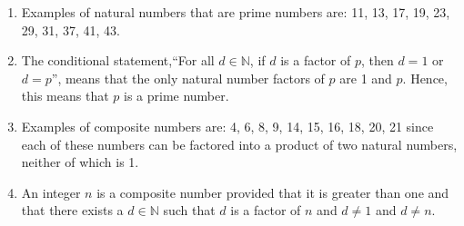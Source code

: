 \documentclass[11pt]{article}
\begin{document}
\begin{enumerate}
\item Examples of natural numbers that are prime numbers are:  11, 13, 17, 19, 23, 29, 31, 37, 41, 43.

\item The conditional statement,``For all  $d \in \mathbb{N}$, if  $d$  is a factor of  $p$, then  $d = 1$ or  $d = p$'', means that the only natural number factors of  $p$  are  1  and  $p$.  Hence, this means that  $p$  is a prime number.

\item Examples of composite numbers are:  4, 6, 8, 9, 14, 15, 16, 18, 20, 21 since each of these numbers can be factored into a product of two natural numbers, neither of which is 1.

\item An integer  $n$ is a composite number provided that it is greater than one and that there exists a $d \in \mathbb{N}$  such that  $d$  is a factor of  $n$  and  $d \ne 1$ and  $d \ne n$.
\end{enumerate}
\end{document}
